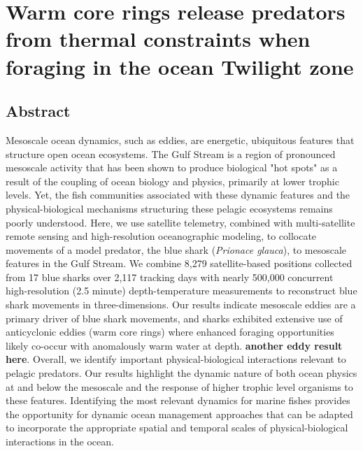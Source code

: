 

\chapter{Warm core rings release predators from thermal constraints when foraging in the ocean Twilight zone}
\label{chap:5}
\raggedbottom

{\let\thefootnote\relax{}}
{\let\thefootnote\relax{}}


\clearpage

\section{Abstract} 

Mesoscale ocean dynamics, such as eddies, are energetic, ubiquitous features that structure open ocean ecosystems. The Gulf Stream is a region of pronounced mesoscale activity that has been shown to produce biological "hot spots" as a result of the coupling of ocean biology and physics, primarily at lower trophic levels. Yet, the fish communities associated with these dynamic features and the physical-biological mechanisms structuring these pelagic ecosystems remains poorly understood. Here, we use satellite telemetry, combined with multi-satellite remote sensing and high-resolution oceanographic modeling, to collocate movements of a model predator, the blue shark (\textit{Prionace glauca}), to mesoscale features in the Gulf Stream. We combine 8,279 satellite-based positions collected from 17 blue sharks over 2,117 tracking days with nearly 500,000 concurrent high-resolution (2.5 minute) depth-temperature measurements to reconstruct blue shark movements in three-dimensions. Our results indicate mesoscale eddies are a primary driver of blue shark movements, and sharks exhibited extensive use of anticyclonic eddies (warm core rings) where enhanced foraging opportunities likely co-occur with anomalously warm water at depth. \textbf{another eddy result here}. Overall, we identify important physical-biological interactions relevant to pelagic predators. Our results highlight the dynamic nature of both ocean physics at and below the mesoscale and the response of higher trophic level organisms to these features. Identifying the most relevant dynamics for marine fishes provides the opportunity for dynamic ocean management approaches that can be adapted to incorporate the appropriate spatial and temporal scales of physical-biological interactions in the ocean.

